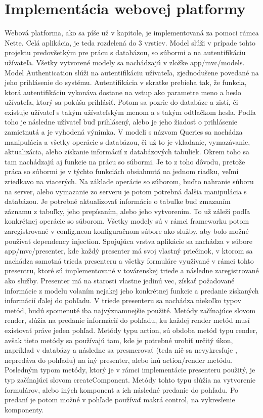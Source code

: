 \section{Implementácia webovej platformy}
Webová platforma, ako sa píše už v kapitole, je implementovaná za pomoci rámca Nette. Celá aplikácia, je teda rozdelená do 3 vrstiev. Model slúži v prípade tohto projektu predovšetkým pre prácu s databázou, so súbormi a na autentifikáciu užívateľa. Všetky vytvorené modely sa nachádzajú v zložke app/mvc/models. Model Authentication slúži na autentifikáciu užívateľa, zjednodušene povedané na jeho prihlásenie do systému. Autentifikácia v skratke prebieha tak, že funkcia, ktorá autentifikáciu vykonáva dostane na vstup ako parametre meno a heslo užívateľa, ktorý sa pokúša prihlásiť. Potom sa pozrie do databáze a zistí, či existuje užívateľ s takým užívateľským menom a s takým odtlačkom hesla. Podľa toho je následne užívateľ buď prihlásený, alebo je jeho žiadosť o prihlásenie zamietnutá a je vyhodená výnimka. V modeli s názvom Queries sa nachádza manipulácia a všetky operácie s databázou, či už to je vkladanie, vymazávanie, aktualizácia, alebo získanie informácií z databázových tabuliek. Okrem toho sa tam nachádzajú aj funkcie na prácu so súbormi. Je to z toho dôvodu, pretože práca so súbormi je v týchto funkciách obsiahnutá na jednom riadku, veľmi zriedkavo na viacerých. Na základe operácie so súborom, buďto nahranie súboru na server, alebo vymazanie zo serveru je potom potrebná ďalšia manipulácia s databázou. Je potrebné aktualizovať informácie o tabuľke buď zmazaním záznamu z tabuľky, jeho prepísaním, alebo jeho vytvorením. To už záleží podľa konkrétnej operácie so súborom. Všetky modely sú v rámci frameworku potom zaregistrované v config.neon konfiguračnom súbore ako služby, aby bolo možné používať dependency injection. 
Spojujúca vrstva aplikácie sa nachádza v súbore app/mvc/presenter, kde každý presenter má svoj vlastný priečinok, v ktorom sa nachádza samotná trieda presenteru a všetky formuláre využívané v rámci tohto presentru, ktoré sú implementované v továrenskej triede a následne zaregistrované ako služby. Presenter má na starosti vlastne jedinú vec, získať požadované informácie z modelu volaním nejakej jeho konkrétnej funkcie a predanie získaných informácií ďalej do pohľadu. V triede presenteru sa nachádza niekoľko typov metód, budú spomenuté iba najvýznamnejšie použité. Metódy začínajúce slovom render, slúžia na predanie informácií do pohľadu, ku každej render metód musí existovať práve jeden pohľad. Metódy typu action, sú obdoba metód typu render, avšak tieto metódy sa používajú tam, kde je potrebné urobiť určitý úkon, napríklad v databázy a následne sa presmerovať (teda nič sa nevykresľuje , nepredáva do pohľadu) na iný presenter, alebo inú action/render metódu. Posledným typom metódy, ktorý je v rámci implementácie presenteru použitý, je typ začínajúci slovom createComponent. Metódy tohto typu slúžia na vytvorenie formulárov, alebo iných komponent a ich následné predanie do pohľadu. Po predaní je potom možné v pohľade používať makrá {control}, na vykreslenie komponenty. 

